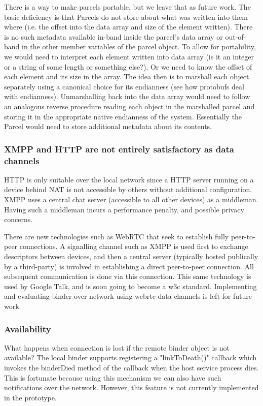 \documentclass[prodmode]{acmlarge}
\begin{document}
There is a way to make parcels portable, but we leave that as future work. The basic deficiency is that Parcels do not store about what was written into them where (i.e. the offset into the data array and size of the element written). There is no such metadata available in-band inside the parcel's data array or out-of-band in the other member variables of the parcel object. To allow for portability, we would need to interpret each element written into data array (is it an integer or a string of some length or something else?). Or we need to know the offset of each element and its size in the array. The idea then is to marshall each object separately using a canonical choice for its endianness (see how protobufs deal with endianness). Unmarshalling back into the data array would need to follow an analogous reverse procedure reading each object in the marshalled parcel and storing it in the appropriate native endianness of the system. Essentially the Parcel would need to store additional metadata about its contents.

\subsubsection{XMPP and HTTP are not entirely satisfactory as data channels}
HTTP is only suitable over the local network since a HTTP server running on a device behind NAT is not accessible by others without additional configuration. XMPP uses a central chat server (accessible to all other devices) as a middleman. Having such a middleman incurs a performance penalty, and possible privacy concerns.

There are new technologies such as WebRTC that seek to establish fully peer-to-peer connections. A signalling channel such as XMPP is used first to exchange descriptors between devices, and then a central server (typically hosted publically by a third-party) is involved in establishing a direct peer-to-peer connection. All subsequent communication is done via this connection. This same technology is used by Google Talk, and is soon going to become a w3c standard. Implementing and evaluating binder over network using webrtc data channels is left for future work.

\subsubsection{Availability}
What happens when connection is lost if the remote binder object is not available? The local binder supports registering a "linkToDeath()"  callback which invokes the binderDied method of the callback when the host service process dies. This is fortunate because using this mechanism we can also have such notifications over the network. However, this feature is not currently implemented in the prototype.
\end{document}
